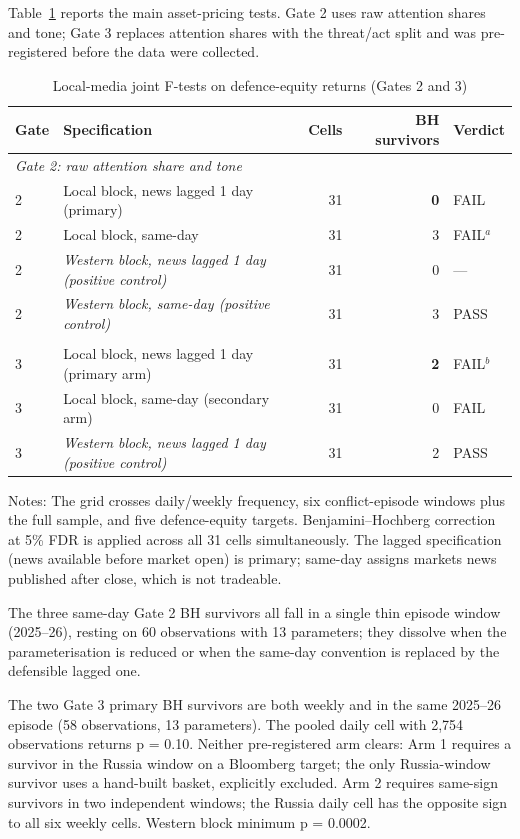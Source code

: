 \documentclass[12pt,a4paper]{article}
\begin{document}
Table~\ref{tab:gates23} reports the main asset-pricing tests. Gate 2 uses raw attention shares and tone; Gate 3 replaces attention shares with the threat/act split and was pre-registered before the data were collected.

\begin{table}[H]
\centering
\caption{Local-media joint F-tests on defence-equity returns (Gates 2 and 3)}
\label{tab:gates23}
\begin{threeparttable}
\begin{tabular}{llrrl}
\toprule
Gate & Specification & Cells & BH survivors & Verdict \\
\midrule
\multicolumn{5}{l}{\textit{Gate 2: raw attention share and tone}} \\
2 & Local block, news lagged 1 day (primary) & 31 & \textbf{0} & FAIL \\
2 & Local block, same-day & 31 & 3 & FAIL$^{a}$ \\
2 & \textit{Western block, news lagged 1 day (positive control)} & 31 & 0 & --- \\
2 & \textit{Western block, same-day (positive control)} & 31 & 3 & PASS \\
\addlinespace
\multicolumn{5}{l}{\textit{Gate 3: threat/act split (pre-registered; 4,027 days)}} \\
3 & Local block, news lagged 1 day (primary arm) & 31 & \textbf{2} & FAIL$^{b}$ \\
3 & Local block, same-day (secondary arm) & 31 & 0 & FAIL \\
3 & \textit{Western block, news lagged 1 day (positive control)} & 31 & 2 & PASS \\
\bottomrule
\end{tabular}
\begin{tablenotes}
\small
\item Notes: The grid crosses daily/weekly frequency, six conflict-episode windows plus the full sample, and five defence-equity targets. Benjamini--Hochberg correction at 5\% FDR is applied across all 31 cells simultaneously. The lagged specification (news available before market open) is primary; same-day assigns markets news published after close, which is not tradeable.
\item[$a$] The three same-day Gate 2 BH survivors all fall in a single thin episode window (2025--26), resting on 60 observations with 13 parameters; they dissolve when the parameterisation is reduced or when the same-day convention is replaced by the defensible lagged one.
\item[$b$] The two Gate 3 primary BH survivors are both weekly and in the same 2025--26 episode (58 observations, 13 parameters). The pooled daily cell with 2,754 observations returns p = 0.10. Neither pre-registered arm clears: Arm 1 requires a survivor in the Russia window on a Bloomberg target; the only Russia-window survivor uses a hand-built basket, explicitly excluded. Arm 2 requires same-sign survivors in two independent windows; the Russia daily cell has the opposite sign to all six weekly cells. Western block minimum p = 0.0002.
\end{tablenotes}
\end{threeparttable}
\end{table}
\end{document}
